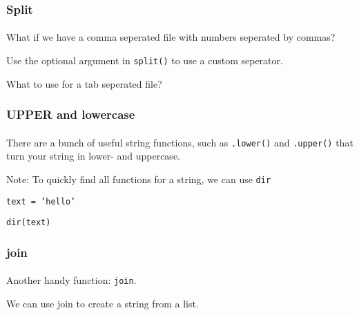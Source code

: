 \begin{frame}\frametitle{Split}
    \framesubtitle{}

    What if we have a comma seperated file with numbers seperated by commas?


    Use the optional argument in \texttt{split()} to use a custom seperator.

    \vfill    \pause

    What to use for a tab seperated file?

\end{frame}

\begin{frame}\frametitle{UPPER and lowercase}
    \framesubtitle{}

    There are a bunch of useful string functions, such as \texttt{.lower()} and \texttt{.upper()} that turn your string in lower- and uppercase.

    Note: To quickly find all functions for a string, we can use \texttt{dir}

    \vfill

    \texttt{text = 'hello'}

    \texttt{dir(text)}

\end{frame}

\begin{frame}\frametitle{join}
    \framesubtitle{}

    Another handy function: \texttt{join}.

    We can use join to create a string from a list.


\end{frame}

